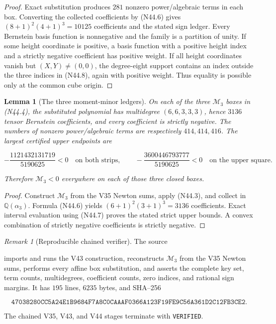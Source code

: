\documentclass[11pt]{article}
\newtheorem{lemma}[theorem]{Lemma}
\theoremstyle{definition}
\theoremstyle{remark}
\newtheorem{remark}[theorem]{Remark}
\begin{document}
\begin{proof}
Exact substitution produces \(281\) nonzero power/algebraic terms in
each box.  Converting the collected coefficients by \textup{(N44.6)} gives
\((8+1)^2(4+1)^3=10125\) coefficients and the stated sign ledger.
Every Bernstein basis function is nonnegative and the family is a
partition of unity.  If some height coordinate is positive, a basis
function with a positive height index and a strictly negative
coefficient has positive weight.  If all height coordinates vanish but
\((X,Y)\neq(0,0)\), the degree-eight support contains an index outside
the three indices in \textup{(N44.8)}, again with positive weight.  Thus equality
is possible only at the common cube origin.
\end{proof}

\begin{lemma}[The three moment-minor ledgers]
\label{lem:f2v44-m3-ledgers}
On each of the three \(\mathcal M_3\) boxes in \textup{(N44.4)}, the
substituted polynomial has multidegree \((6,6,3,3,3)\), hence \(3136\)
tensor Bernstein coefficients, and every coefficient is strictly
negative.  The numbers of nonzero power/algebraic terms are respectively
\(414,414,416\).  The largest certified upper endpoints are

\[
 -\frac{1121432131719}{5190625}<0
 \quad\text{on both strips},
 \qquad
 -\frac{3600446793777}{5190625}<0
 \quad\text{on the upper square}.
\tag{N44.10}
\]

Therefore \(\mathcal M_3<0\) everywhere on each of those three closed
boxes.
\end{lemma}

\begin{proof}
Construct \(\mathcal M_3\) from the V35 Newton sums, apply \textup{(N44.3)}, and
collect in \(\mathbb Q(\alpha_3)\).  Formula \textup{(N44.6)} yields
\((6+1)^2(3+1)^3=3136\) coefficients.  Exact interval evaluation using
\textup{(N44.7)} proves the stated strict upper bounds.  A convex combination of
strictly negative coefficients is strictly negative.
\end{proof}

\begin{remark}[Reproducible chained verifier]
\label{rem:f2v44-verifier}
The source
\begin{center}
\end{center}
imports and runs the V43 construction, reconstructs \(\mathcal M_3\)
from the V35 Newton sums, performs every affine box substitution, and
asserts the complete key set, term counts, multidegrees, coefficient
counts, zero indices, and rational sign margins.  It has \(195\) lines,
\(6235\) bytes, and SHA--256

\[
 \texttt{47038280CC5A24E1B9684F7A8C0CAAAF}
 \allowbreak\texttt{0366A123F19FE9C56A361D2C12FB3CE2}.
\tag{N44.11}
\]

The chained V35, V43, and V44 stages terminate with
\texttt{VERIFIED}.
\end{remark}
\end{document}
